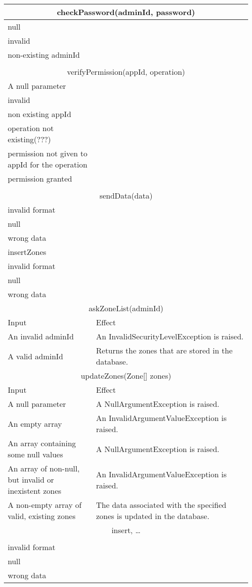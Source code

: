 \documentclass[11pt,oneside,a4paper]{report}
\begin{document}
\begin{tabular}{p{5cm}|p{6cm}}
	\hline
	\multicolumn{2}{c}{checkPassword(adminId, password)}\\\hline
	
	null\\\hline invalid\\\hline
	non-existing adminId\\\hline\\\hline
	
	\multicolumn{2}{c}{	 verifyPermission(appId, operation)}\\\hline

	A null parameter\\\hline invalid\\\hline
	non existing appId\\\hline operation not existing(???)\\\hline
	permission not given to appId for the operation\\\hline
	permission granted\\\hline\\\hline
	
	\multicolumn{2}{c}{
	 sendData(data)}\\\hline
	invalid format\\\hline null\\\hline
	wrong data\\\hline
	insertZones\\\hline
	invalid format\\\hline null\\\hline
	wrong data\\\hline


	\multicolumn{2}{c}{askZoneList(adminId)}\\
	Input & Effect \\\hline
	An invalid adminId &
	An InvalidSecurityLevelException is raised. \\\hline	
	A valid adminId &
	Returns the zones that are stored in the database.  \\\hline\hline

	\multicolumn{2}{c}{updateZones(Zone[] zones)}\\\hline
	Input & Effect \\\hline
	A null parameter &
	A NullArgumentException is raised.\\\hline
	An empty array &
	An InvalidArgumentValueException is raised.\\\hline
	An array containing some null values &
	A NullArgumentException is raised.\\\hline
	An array of non-null, but invalid or inexistent zones &
	An InvalidArgumentValueException  is raised. \\\hline
	A non-empty array of valid, existing zones &
	The data associated with the specified zones is updated in the database. \\\hline\hline
	
	\multicolumn{2}{c}{insert, …}\\\hline\\\hline
	invalid format\\\hline null\\\hline
	wrong data\\\hline
\end{tabular}
\end{document}
